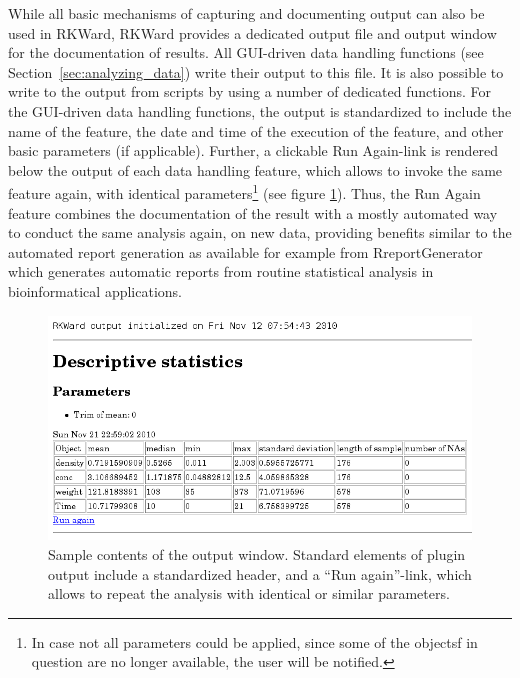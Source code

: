 While all basic mechanisms of
capturing and documenting  output can also
be used in RKWard, RKWard provides a dedicated output file and output
window for the documentation of results. All GUI-driven data handling
functions (see Section~\ref{sec:analyzing_data}) write their output to this file. It is also
possible to write to the output from 
scripts by using a number of dedicated 
functions. For the GUI-driven data handling functions, the output is
standardized to include the name of the feature, the date and time of
the execution of the feature, and other basic parameters (if
applicable). Further, a clickable Run
Again-link is rendered below the output of each data
handling feature, which allows to invoke the same feature again, with
identical parameters\footnote{In case not all parameters could be
applied, since some of the  objectsf in
question are no longer available, the user will be notified.} (see
figure \ref{fig:results_output}). Thus, the Run
Again feature combines the documentation of the result
with a mostly automated way to conduct the same analysis again, on new
data, providing benefits similar to the automated report generation as
available for example from RreportGenerator
\citep{RaffelsbergerW2008} which generates automatic
reports from routine statistical analysis in bioinformatical
applications.

\begin{figure}[htp]
 \centering
 \includegraphics{../figures/results_output_cropped.png}
 \caption{Sample contents of the output window. Standard elements of plugin output include
 a standardized header, and a ``Run again''-link, which allows to repeat the analysis with
 identical or similar parameters.}
 \label{fig:results_output}
\end{figure}

